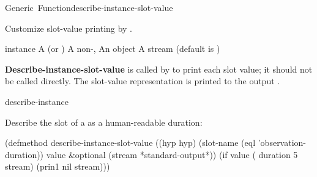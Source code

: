 \documentclass[10pt,twoside,english,pdftex]{article}
\begin{document}

\begin{functiondoc}{Generic~Function}{describe-instance-slot-value}%
  {
     }
%
%
%

\fnsyntax

\fnpurpose Customize slot-value printing by
\textbf{}.

\fnmethods
{}%
  {\code{(} 
     }

\fnpackage {}

\fnmodule {}

%
\fnargs
\begin{args}{instance}
\arg[instance] A  (or )
 A non-\nil, 
\arg[value] An object
\arg[stream] A stream (default is )
\end{args}

\fndescription 
{}%
%
\textbf{Describe-instance-slot-value} is called by
 to print each slot value; it
should not be called directly. The slot-value representation is printed to the
output .

\begin{alsos}{describe-instance}
\end{alsos}

\fnexample
%
%  
%
Describe the  slot of a 
 as a human-readable duration:
%
\W\supp
\begin{example}
  (defmethod describe-instance-slot-value
      ((hyp hyp)
       (slot-name (eql 'observation-duration)) value
       \&optional (stream *standard-output*))
    (if value
        ( duration 5 stream)
        (prin1 nil stream)))
\end{example}

\end{functiondoc}
\end{document}
